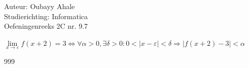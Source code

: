 \documentclass[a4paper]{article}
\newcommand{\llim}{\lim\limits}
\begin{document}
  
\noindent \large Auteur: Oubayy Ahale          \\
\noindent \large Studierichting: Informatica   \\
\noindent \large Oefeningenreeks 2C nr. 9.7    \\

\medskip

\normalsize

$\llim_{x \rightarrow \varepsilon} f(x + 2) = 3 \Leftrightarrow \forall \alpha > 0, \exists \delta > 0 : 0 < |x - \varepsilon| < \delta \Rightarrow |f(x + 2) - 3| < \alpha$\\

\begin{thebibliography}{999}
\end{thebibliography}
\end{document}
